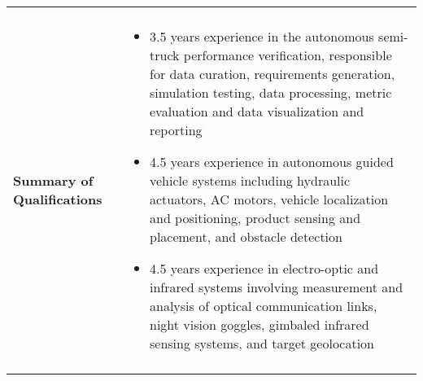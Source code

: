 \begin{tabular}{L{\lcolw}  L{\rcolw}}
 \hline \hline \\
\textbf{\Large Summary of Qualifications} &
\vspace{-0.3in} 
    \begin{itemize}[leftmargin = \itemmargin]

	\item 3.5 years experience in the autonomous semi-truck performance verification, responsible for data curation, requirements generation, simulation testing, data processing, metric evaluation
	and data visualization and reporting
		
	\item 4.5 years experience in autonomous guided vehicle systems including hydraulic actuators, AC motors, vehicle localization and positioning, 
	product sensing and placement, and obstacle detection

	\item 4.5 years experience in electro-optic and infrared systems involving measurement and analysis of optical communication links, 
	night vision goggles, gimbaled infrared sensing systems, and target geolocation
	
	\end{itemize}\\
 \hline \\ 
\end{tabular}